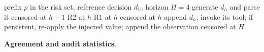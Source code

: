\documentclass[a4paper,fleqn]{cas-sc}
\begin{document}
\begin{algorithm}[htbp]
  \caption{Recovery endpoint coding for one at-risk sequence.}
  \label{alg:recovery}
  \begin{algorithmic}[1]
    \Require prefix $p$ in the risk set, reference decision $d_V$, horizon $H=4$
      \State generate $d_h$ and parse it
        \State \Return censored at $h-1$ 
      \EndIf
        \State \Return R2 at $h$ 
      \EndIf
        \State \Return R1 at $h$ 
      \EndIf
        \State \Return censored at $h$
      \EndIf
      \State append $d_h$; invoke its tool; if persistent, re-apply the injected value;
      append the observation
    \EndFor
    \State \Return censored at $H$
  \end{algorithmic}
\end{algorithm}

\noindent\textbf{Agreement and audit statistics}.\
\end{document}
